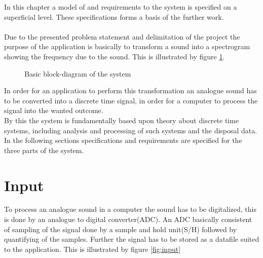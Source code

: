 In this chapter a model of and requirements to the system is specified on a superficial level. These specifications forms a basis of the further work. 
\\ \\
Due to the presented problem statement and delimitation of the project the purpose of the application is basically to transform a sound into a spectrogram showing the frequency due to the sound. This is illustrated by figure \ref{fig:model1}.    
\begin{figure}[h]
\centering
{}
\caption{Basic block-diagram of the system}
\label{fig:model1}
\end{figure}
In order for an application to perform this transformation an analogue sound has to be converted into a discrete time signal, in order for a computer to process the signal into the wanted outcome. \\
By this the system is fundamentally based upon theory about discrete time systems, including analysis and processing of such systems and the disposal data. \\
In the following sections specifications and requirements are specified for the three parts of the system.  

\section{Input}
To process an analogue sound in a computer the sound has to be digitalized, this is done by an analogue to digital converter(ADC). An ADC basically consistent of sampling of the signal done by a sample and hold unit(S/H) followed by quantifying of the samples. Further the signal has to be stored as a datafile suited to the application. This is illustrated by figure \ref{fig:input} 

